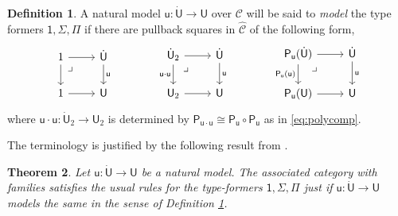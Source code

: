 \documentclass[12pt,reqno]{amsart}
\newcommand{\CC}{\ensuremath{\mathcal{C}}}
\newcommand{\alg}[1]{\ensuremath{\mathsf{#1}}}
\renewcommand{\to}{\ensuremath{\rightarrow}}
\renewcommand{\t}{\ensuremath{\mathsf{u}}}
\newcommand{\T}{\ensuremath{\mathsf{U}}}
\newcommand{\TT}{\ensuremath{\dot{\mathsf{U}}}}
\newcommand{\tT}{\ensuremath{{\t}:\TT\to\T}}
\newcommand{\pbcorner}{\arrow[dr,phantom,"\lrcorner" very near start, shift right=.5ex]} %
\newtheorem{theorem}{Theorem}
\theoremstyle{remark}
\theoremstyle{definition}
\newtheorem{definition}[theorem]{Definition}
\begin{document}
\begin{definition}\label{def:modelthetypeformers}
A natural model $\tT$ over $\CC$ will be said to \emph{model} the type formers $ \mathsf{1}, \Sigma, \Pi$ if there are pullback squares in $\widehat{\CC}$ of the following form,
%
\begin{equation}\label{diag:naturalmodelPiSigma1}
\begin{tikzcd}
	1 \ar[r] \ar[d] \pbcorner &  \TT \ar[d, "\t"]\\  
	1 \ar[r] & \T
 \end{tikzcd} \qquad \qquad 
 \begin{tikzcd}
	\TT_2  \ar[r] \ar[d,swap,"\t\cdot\t"] \pbcorner &  \TT \ar[d, "\t"]\\  
	\T_2 \ar[r] & \T
	 \end{tikzcd} \qquad \qquad 
	 \begin{tikzcd}
	 \alg{P}_\t(\TT) \ar[r] \ar[d,swap,"\alg{P}_\t(\t)"] \pbcorner &  \TT \ar[d, "\t"]\\  
	\alg{P}_\t(\T) \ar[r] & \T
 \end{tikzcd} 
 \end{equation}
%
where $\t\cdot\t : \dot{\T}_2 \to \T_2$ is determined by $\alg{P}_{\t\cdot\t} \cong  \alg{P}_{\t} \circ \alg{P}_{\t}$ as in \eqref{eq:polycomp}.
\end{definition}
%
The terminology is justified by the following result from \cite[Theorem 16]{awodey:NM}.
%
\begin{theorem}\label{thm:nmcwf}
Let $\tT$ be a natural model. The associated category with families satisfies the usual rules for the type-formers $\mathsf{1}, \Sigma, \Pi$ just if $\tT$ models the same in the sense of Definition \ref{def:modelthetypeformers}.
\end{theorem}
\end{document}
